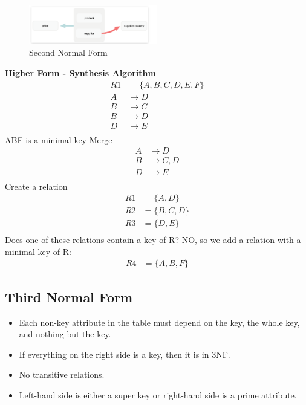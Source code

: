 \documentclass{article}
\begin{document}
\begin{figure}[h]
    \centering
    \includegraphics[width=0.5\textwidth]{assets/second_normal_form.png}
    \caption{Second Normal Form}
\end{figure}
\textbf{Higher Form - Synthesis Algorithm}
\begin{align*}
    R1 & = \{A, B, C, D, E, F\} \\
    A  & \rightarrow D          \\
    B  & \rightarrow C          \\
    B  & \rightarrow D          \\
    D  & \rightarrow E          \\
\end{align*}
ABF is a minimal key
Merge
\begin{align*}
    A & \rightarrow D \\ B &\rightarrow C, D \\ D &\rightarrow E \\
\end{align*}
Create a relation
\begin{align*}
    R1 & = \{A, D\}    \\
    R2 & = \{B, C, D\} \\
    R3 & = \{D, E\}    \\
\end{align*}
Does one of these relations contain a key of R? NO, so we add a relation with a
minimal key of R:
\begin{align*}
R4 &= \{A, B, F\}
\end{align*}
\subsection{Third Normal Form}
\begin{itemize}
    \item Each non-key attribute in the table must depend on the key, the whole key, and
          nothing but the key.
    \item If everything on the right side is a key, then it is in 3NF.
    \item No transitive relations.
    \item Left-hand side is either a super key or right-hand side is a prime attribute.
\end{itemize}
\end{document}
